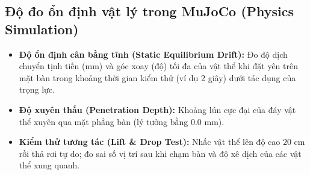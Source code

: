 \subsection{Độ đo ổn định vật lý trong MuJoCo (Physics Simulation)}
\begin{itemize}
    \item \textbf{Độ ổn định cân bằng tĩnh (Static Equilibrium Drift):} Đo độ dịch chuyển tịnh tiến (mm) và góc xoay (độ) tối đa của vật thể khi đặt yên trên mặt bàn trong khoảng thời gian kiểm thử (ví dụ 2 giây) dưới tác dụng của trọng lực.
    \item \textbf{Độ xuyên thấu (Penetration Depth):} Khoảng lún cực đại của đáy vật thể xuyên qua mặt phẳng bàn (lý tưởng bằng $0.0\text{ mm}$).
    \item \textbf{Kiểm thử tương tác (Lift \& Drop Test):} Nhấc vật thể lên độ cao $20\text{ cm}$ rồi thả rơi tự do; đo sai số vị trí sau khi chạm bàn và độ xê dịch của các vật thể xung quanh.
\end{itemize}
